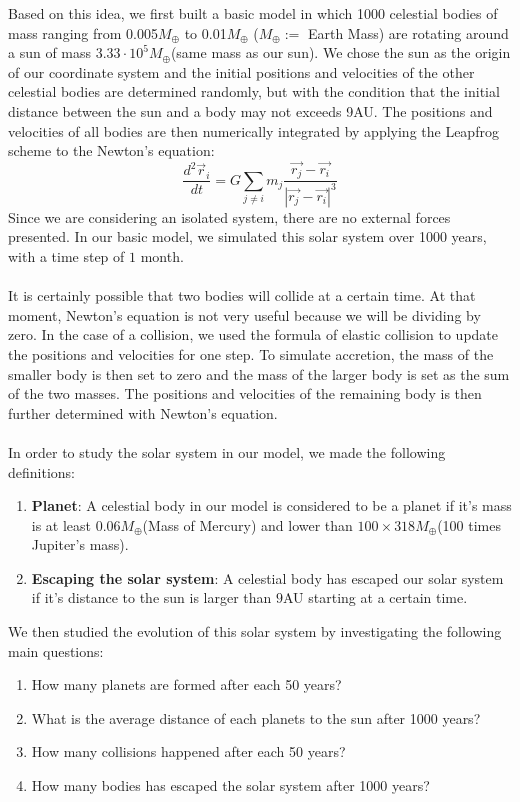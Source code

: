 Based on this idea, we first built a basic model in which 1000 celestial bodies of mass ranging from 0.005$M_{\oplus}$ to 0.01$M_{\oplus}$ ($M_{\oplus}:=$ Earth Mass) are rotating around a sun of mass $3.33\cdot 10^5 M_{\oplus}$(same mass as our sun). We chose the sun as the origin of our coordinate system and the initial positions and velocities of the other celestial bodies are determined randomly, but with the condition that the initial distance between the sun and a body may not exceeds 9AU. The positions and velocities of all bodies are then numerically integrated by applying the Leapfrog scheme to the Newton's equation:
\[\frac{d^2\vec{r}_i}{dt}=G\sum_{j\neq i}m_j\frac{\vec{r_j}-\vec{r_i}}{|\vec{r_j}-\vec{r_i}|^3}\]
Since we are considering an isolated system, there are no external forces presented. In our basic model, we simulated this solar system over 1000 years, with a time step of $1$ month.\\
\\
It is certainly possible that two bodies will collide at a certain time. At that moment, Newton's equation is not very useful because we will be dividing by zero. In the case of a collision, we used the formula of elastic collision to update the positions and velocities for one step. To simulate accretion, the mass of the smaller body is then set to zero and the mass of the larger body is set as the sum of the two masses. The positions and velocities of the remaining body is then further determined with Newton's equation.\\
\\
In order to study the solar system in our model, we made the following definitions:\\
\begin{enumerate}
\item \textbf{Planet}: A celestial body in our model is considered to be a planet if it's mass is at least  0.06$M_{\oplus}$(Mass of Mercury) and lower than $100\times 318M_{\oplus}$(100 times Jupiter's mass).
\item \textbf{Escaping the solar system}: A celestial body has escaped our solar system if it's distance to the sun is larger than $9$AU starting at a certain time.
\end{enumerate}
We then studied the evolution of this solar system by investigating the following main questions:
\begin{enumerate}
	\item 	How many planets are formed after each 50 years? 

	\item What is the average distance of each planets to the sun after 1000 years?
	
	\item How many collisions happened after each 50 years?
	
	\item How many bodies has escaped the solar system after 1000 years?
\end{enumerate}
 